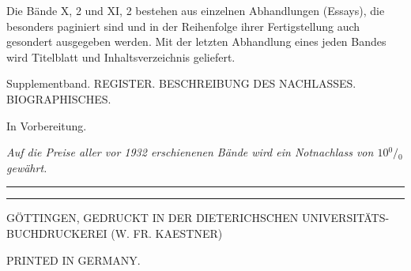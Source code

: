 {\begin{minipage}{\dimexpr\textwidth-2\fboxsep-2\fboxrule\relax}
\par\noindent\hspace*{3em}Die Bände X, 2 und XI, 2 bestehen aus einzelnen Abhandlungen (Essays), die besonders paginiert sind und in der Reihenfolge ihrer Fertigstellung auch gesondert ausgegeben werden. Mit der letzten Abhandlung eines jeden Bandes wird Titelblatt und Inhaltsverzeichnis geliefert.
\par\noindent Supplementband. REGISTER. BESCHREIBUNG DES NACHLASSES. BIOGRAPHISCHES.
\par\noindent\hfill In Vorbereitung.
\par\medskip\noindent\hspace*{2em}\textit{Auf die Preise aller vor 1932 erschienenen Bände wird ein Notnachlass von \(10{}^0\!/\!{}_0\) gewährt.}
\par\bigskip\noindent\rule{\linewidth}{.25pt}\par\vspace{-5pt}\noindent\rule{\linewidth}{.25pt}
\begin{center}\fontsize{7}{8.5}\selectfont GÖTTINGEN, GEDRUCKT IN DER DIETERICHSCHEN UNIVERSITÄTS-BUCHDRUCKEREI (W. FR. KAESTNER)\end{center}
\end{minipage}}
\par\smallskip\begin{center}\footnotesize PRINTED IN GERMANY.\end{center}
\clearpage\endgroup
